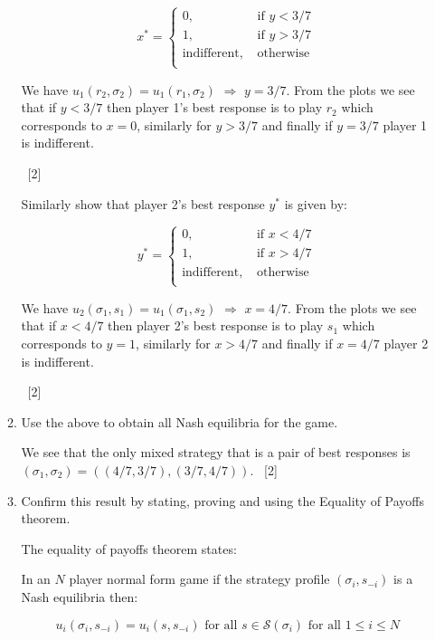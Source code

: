 \documentclass[12pt,a4paper]{article}
\begin{document}
\begin{enumerate}
\begin{enumerate}
            \[
            x^*=\begin{cases}
                0,&\text{ if } y < 3/7\\
                1,&\text{ if } y > 3/7\\
                \text{indifferent},&\text{ otherwise }\\
            \end{cases}
            \]

            We have $u_1(r_2,\sigma_2)=u_1(r_1,\sigma_2)$ $\Rightarrow$ $y=3/7$. From the plots we see that if $y<3/7$ then player 1's best response is to play $r_2$ which corresponds to $x=0$, similarly for $y>3/7$ and finally if $y=3/7$ player 1 is indifferent.

        ~\hfill{[2]}

            Similarly show that player 2's best response $y^*$ is given by:

            \[
            y^*=\begin{cases}
                0,&\text{ if } x < 4/7\\
                1,&\text{ if } x > 4/7\\
                \text{indifferent},&\text{ otherwise }\\
            \end{cases}
            \]

            We have $u_2(\sigma_1,s_1)=u_1(\sigma_1,s_2)$ $\Rightarrow$ $x=4/7$. From the plots we see that if $x<4/7$ then player 2's best response is to play $s_1$ which corresponds to $y=1$, similarly for $x>4/7$ and finally if $x=4/7$ player 2 is indifferent.

        ~\hfill{[2]}

        \item Use the above to obtain all Nash equilibria for the game.

        We see that the only mixed strategy that is a pair of best responses is $(\sigma_1,\sigma_2)=((4/7,3/7),(3/7,4/7))$.
        ~\hfill{[2]}

        \item Confirm this result by stating, proving and using the Equality of Payoffs theorem.

            The equality of payoffs theorem states:

            In an $N$ player normal form game if the strategy profile $(\sigma_i,s_{-i})$ is a Nash equilibria then:

            $$u_{i}(\sigma_i,s_{-i})=u_{i}(s,s_{-i})\text{ for all }s\in\mathcal{S}(\sigma_i)\text{ for all }1\leq i\leq N$$


\end{enumerate}
\end{enumerate}
\end{document}
